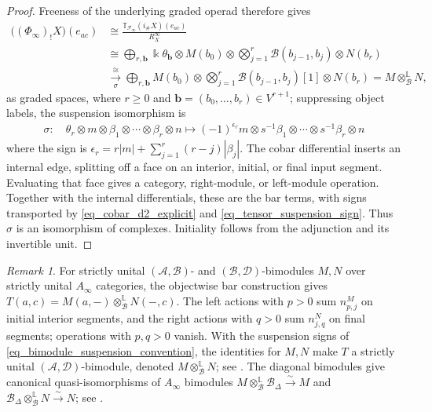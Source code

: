 \documentclass[11pt,letterpaper]{article}
\numberwithin{equation}{section}
\theoremstyle{plain}
\theoremstyle{definition}
\theoremstyle{remark}
\newtheorem{rmk}[thm]{Remark}
\begin{document}
\begin{proof}
Freeness of the underlying graded operad therefore gives
\begin{align*}
 \bigl((\Phi_\infty)_!X\bigr)(e_{ac})
 &\cong
 \frac{\mathbb T_{\mathscr P_\infty}(i_\#X)(e_{ac})}{R_X^\infty}\\
 &\cong
 \bigoplus_{r,\mathbf b}\Bbbk\theta_{\mathbf b}\otimes M(b_0)
 \otimes\bigotimes_{j=1}^r\mathcal B(b_{j-1},b_j)\otimes N(b_r)\\
 &\xrightarrow[\;\sigma\;]{\cong}
 \bigoplus_{r,\mathbf b}M(b_0)
 \otimes\bigotimes_{j=1}^r\mathcal B(b_{j-1},b_j)[1]\otimes N(b_r) =M\otimes_{\mathcal B}^{\mathbb L}N,
\end{align*}
as graded spaces, where $r\ge0$ and $\mathbf b=(b_0,\ldots,b_r)\in V^{r+1}$; suppressing object labels, the suspension isomorphism is
\begin{equation}\label{eq_tensor_suspension_sign}
\begin{gathered}
 \sigma:\quad
 \theta_r\otimes m\otimes\beta_1\otimes\cdots\otimes\beta_r\otimes n
 \longmapsto
 (-1)^{\epsilon_r}m\otimes s^{-1}\beta_1\otimes\cdots
 \otimes s^{-1}\beta_r\otimes n
\end{gathered}
\end{equation}
where the sign is $\epsilon_r=r|m|+\sum_{j=1}^r(r-j)|\beta_j|$.
The cobar differential inserts an internal edge, splitting off
a face on an interior, initial, or final input segment.
Evaluating that face gives a category, right-module, or left-module
operation. Together with the internal differentials, these are
the bar terms, with signs transported by
\eqref{eq_cobar_d2_explicit} and \eqref{eq_tensor_suspension_sign}.
Thus $\sigma$ is an isomorphism of complexes.
Initiality follows from the adjunction and its invertible unit.
\end{proof}


\begin{rmk}
	For strictly unital
$(\mathcal A,\mathcal B)$- and $(\mathcal B,\mathcal D)$-bimodules
$M,N$ over strictly unital $A_\infty$ categories, the objectwise bar
construction gives
$ T(a,c)=M(a,-)\otimes_{\mathcal B}^{\mathbb L}N(-,c)$.
The left actions with $p>0$ sum $n^M_{p,j}$ on initial interior
segments, and the right actions with $q>0$ sum $n^N_{j,q}$ on final
segments; operations with $p,q>0$ vanish. With the suspension signs
of \eqref{eq_bimodule_suspension_convention}, the identities for
$M,N$ make $T$ a strictly unital $(\mathcal A,\mathcal D)$-bimodule,
denoted $M\otimes_{\mathcal B}^{\mathbb L}N$; see
\cite[\S~3.1.2]{Ganatra_Pardon_Shende_sectors}.
The diagonal bimodules give canonical quasi-isomorphisms of
$A_\infty$ bimodules
$M\otimes_{\mathcal B}^{\mathbb L}\mathcal B_\Delta\xrightarrow{\sim}M$
and
$\mathcal B_\Delta\otimes_{\mathcal B}^{\mathbb L}N\xrightarrow{\sim}N$;
see \cite[Lemma~3.7]
{Ganatra_Pardon_Shende_sectors}.
\end{rmk}
\end{document}
